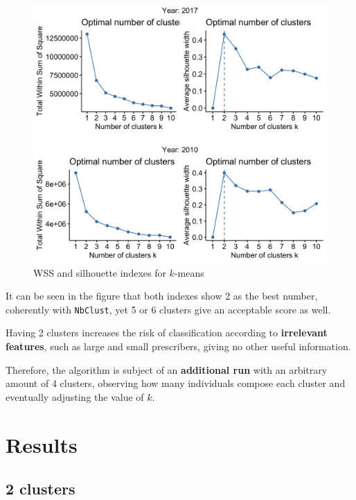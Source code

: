 \begin{figure}[h]
	\centering
	\includegraphics[scale=0.22]{../k-means/optimal-clusters.png}
	\caption{\small WSS and silhouette indexes for $k$-means}
\end{figure}

It can be seen in the figure that both indexes show 2 as the best number, coherently with \texttt{NbClust}, yet 5 or 6 clusters give an acceptable score as well.

Having 2 clusters increases the risk of classification according to \textbf{irrelevant features}, such as large and small prescribers, giving no other useful information.

Therefore, the algorithm is subject of an \textbf{additional run} with an arbitrary amount of 4 clusters, observing how many individuals compose each cluster and eventually adjusting the value of $k$.

\section{Results}

\subsection{2 clusters} 

